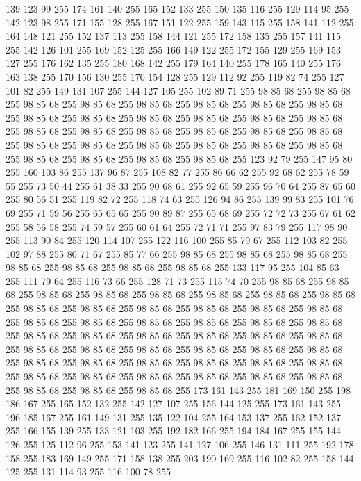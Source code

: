 139 123 99 255 174 161 140 255 165 152 133 255 150 135 116 255 129 114 95 255 142 123 98 255 171 155 128 255 167 151 122 255 159 143 115 255 158 141 112 255 164 148 121 255 152 137 113 255 158 144 121 255 172 158 135 255 157 141 115 255 142 126 101 255 169 152 125 255 166 149 122 255 172 155 129 255 169 153 127 255 176 162 135 255 180 168 142 255 179 164 140 255 178 165 140 255 176 163 138 255 170 156 130 255 170 154 128 255 129 112 92 255 119 82 74 255 127 101 82 255 149 131 107 255 144 127 105 255 102 89 71 255 98 85 68 255 98 85 68 255 98 85 68 255 98 85 68 255 98 85 68 255 98 85 68 255 98 85 68 255 98 85 68 255 98 85 68 255 98 85 68 255 98 85 68 255 98 85 68 255 98 85 68 255 98 85 68 255 98 85 68 255 98 85 68 255 98 85 68 255 98 85 68 255 98 85 68 255 98 85 68 255 98 85 68 255 98 85 68 255 98 85 68 255 98 85 68 255 98 85 68 255 98 85 68 255 98 85 68 255 98 85 68 255 98 85 68 255 98 85 68 255 123 92 79 255
147 95 80 255 160 103 86 255 137 96 87 255 108 82 77 255 86 66 62 255 92 68 62 255 78 59 55 255 73 50 44 255 61 38 33 255 90 68 61 255 92 65 59 255 96 70 64 255 87 65 60 255 80 56 51 255 119 82 72 255 118 74 63 255 126 94 86 255 139 99 83 255 101 76 69 255 71 59 56 255 65 65 65 255 90 89 87 255 65 68 69 255 72 72 73 255 67 61 62 255 58 56 58 255 74 59 57 255 60 61 64 255 72 71 71 255 97 83 79 255 117 98 90 255 113 90 84 255 120 114 107 255 122 116 100 255 85 79 67 255 112 103 82 255 102 97 88 255 80 71 67 255 85 77 66 255 98 85 68 255 98 85 68 255 98 85 68 255 98 85 68 255 98 85 68 255 98 85 68 255 98 85 68 255 133 117 95 255 104 85 63 255 111 79 64 255 116 73 66 255 128 71 73 255 115 74 70 255 98 85 68 255 98 85 68 255 98 85 68 255 98 85 68 255 98 85 68 255 98 85 68 255 98 85 68 255 98 85 68 255 98 85 68 255 98 85 68 255 98 85 68 255 98 85 68 255
98 85 68 255 98 85 68 255 98 85 68 255 98 85 68 255 98 85 68 255 98 85 68 255 98 85 68 255 98 85 68 255 98 85 68 255 98 85 68 255 98 85 68 255 98 85 68 255 98 85 68 255 98 85 68 255 98 85 68 255 98 85 68 255 98 85 68 255 98 85 68 255 98 85 68 255 98 85 68 255 98 85 68 255 98 85 68 255 98 85 68 255 98 85 68 255 98 85 68 255 98 85 68 255 98 85 68 255 98 85 68 255 98 85 68 255 98 85 68 255 98 85 68 255 98 85 68 255 98 85 68 255 98 85 68 255 98 85 68 255 173 161 143 255 181 169 150 255 198 186 167 255 165 152 132 255 142 127 107 255 156 144 125 255 173 161 143 255 196 185 167 255 161 149 131 255 135 122 104 255 164 153 137 255 162 152 137 255 166 155 139 255 133 121 103 255 192 182 166 255 194 184 167 255 155 144 126 255 125 112 96 255 153 141 123 255 141 127 106 255 146 131 111 255 192 178 158 255 183 169 149 255 171 158 138 255 203 190 169 255 116 102 82 255 158 144 125 255 131 114 93 255 116 100 78 255
